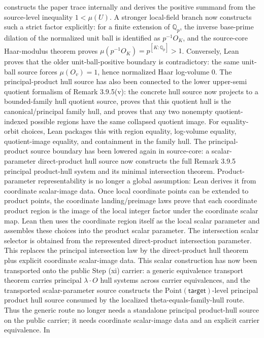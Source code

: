 \documentclass[11pt]{article}
\theoremstyle{plain}
\theoremstyle{definition}
\theoremstyle{remark}
\begin{document}
constructs the paper trace internally and derives the positive summand from the
source-level inequality \(1<\mu(U)\).  A stronger local-field branch now
constructs such a strict factor explicitly: for a finite extension of
\(\mathbb Q_p\), the inverse base-prime dilation of the normalized unit ball is
identified as \(p^{-1}O_K\), and the source-core Haar-modulus theorem proves
\(\mu(p^{-1}O_K)=p^{[K:\mathbb Q_p]}>1\).  Conversely, Lean proves that the
older unit-ball-positive boundary is contradictory: the same unit-ball source
forces \(\mu(O_v)=1\), hence normalized Haar log-volume \(0\).
The principal-product hull source has also been connected to the lower
upper-semi quotient formalism of Remark 3.9.5(v): the concrete hull source now
projects to a bounded-family hull quotient source, proves that this quotient
hull is the canonical/principal family hull, and proves that any two nonempty
quotient-indexed possible regions have the same collapsed quotient image.  For
equality-orbit choices, Lean packages this with region equality, log-volume
equality, quotient-image equality, and containment in the family hull.
The principal-product source boundary has been lowered again in source-core:
a scalar-parameter direct-product hull source now constructs the full
Remark 3.9.5 principal product-hull system and its minimal intersection
theorem.  Product-parameter representability is no longer a global
assumption: Lean derives it from coordinate scalar-image data.  Once local
coordinate points can be extended to product points, the coordinate
landing/preimage laws prove that each coordinate product region is the image
of the local integer factor under the coordinate scalar map.  Lean then uses
the coordinate region itself as the local scalar parameter and assembles these
choices into the product scalar parameter.  The intersection scalar selector
is obtained from the represented direct-product intersection parameter.  This
replaces the principal intersection law by the direct-product hull theorem
plus explicit coordinate scalar-image data.
This scalar construction has now been transported onto the public Step (xi)
carrier: a generic equivalence transport theorem carries principal
\(\lambda\cdot O\) hull systems across carrier equivalences, and the
transported scalar-parameter source constructs the
\(\mathrm{Point}(\mathsf{target})\)-level principal product hull source consumed by the
localized theta-equals-family-hull route.  Thus the generic route no longer
needs a standalone principal product-hull source on the public carrier; it
needs coordinate scalar-image data and an explicit carrier equivalence.  In
\end{document}
